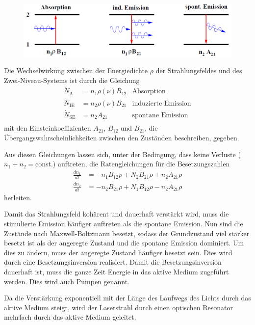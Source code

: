 \documentclass[]{scrartcl}
\begin{document}
\begin{figure}[h]
 \centering
 \includegraphics[]{images/schema_uebergaenge.png}
 \label{fig:schema_uebergaenge}
\end{figure}

Die Wechselwirkung zwischen der Energiedichte $\rho$ der Strahlungsfeldes und des Zwei-Niveau-Systems ist durch die Gleichung
\begin{align}
 \dot{N}_\text{A}   & =n_1 \rho\left(\nu \right)B_{12}  &\text{Absorption} \\
 \dot{N}_\text{IE}  & =n_2 \rho\left(\nu \right)B_{21}  &\text{induzierte Emission} \\
 \dot{N}_\text{SE}  & =n_2 A_{21}                       &\text{spontane Emission} \\
\end{align}
mit den Einsteinkoeffizienten $A_{21}$, $B_{12}$ und $B_{21}$, die Übergangswahrscheinlichkeiten zwischen den Zuständen beschreiben, gegeben.

Aus diesen Gleichungen lassen sich, unter der Bedingung, dass keine Verluste ($n_1+n_2=$const.) auftreten, die Ratengleichungen für die Besetzungszahlen
\begin{align}
 \frac{d n_1}{d t}&=-n_1B_{12}\rho+N_2B_{21}\rho+n_2A_{21}\rho \\
 \frac{d n_2}{d t}&=-n_2B_{21}\rho+N_1B_{12}\rho-n_2A_{21}\rho
\end{align}
herleiten.

Damit das Strahlungsfeld kohärent und dauerhaft verstärkt wird, muss die stimulierte Emission häufiger auftreten als die spontane Emission. 
Nun sind die Zustände nach Maxwell-Boltzmann besetzt, sodass der Grundzustand viel stärker besetzt ist als der angeregte Zustand und die spontane Emission dominiert.
Um dies zu ändern, muss der angeregte Zustand häufiger besetzt sein. Dies wird durch eine Besetzungsinversion realisiert. 
Damit die Besetzungsinversion dauerhaft ist, muss die ganze Zeit Energie in das aktive Medium zugeführt werden. Dies wird auch Pumpen genannt.

Da die Verstärkung exponentiell mit der Länge des Laufwegs des Lichts durch das aktive Medium steigt, wird der Laserstrahl durch einen optischen Resonator mehrfach durch das aktive Medium geleitet.
\end{document}
